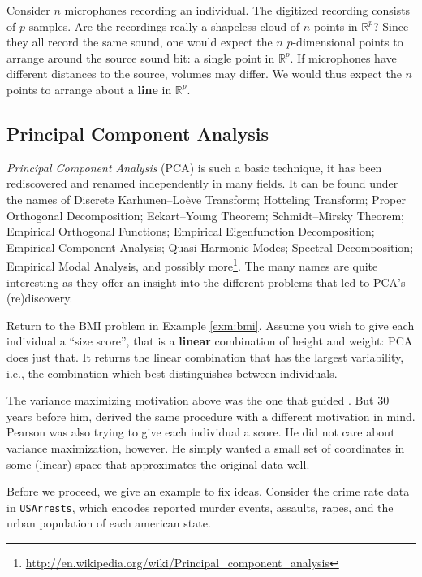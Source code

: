 \documentclass[]{book}
\theoremstyle{definition}
\theoremstyle{definition}
\theoremstyle{definition}
\theoremstyle{remark}
\let\BeginKnitrBlock\begin \let\EndKnitrBlock\end
\begin{document}
\BeginKnitrBlock{example}
\protect\hypertarget{exm:blind-signal}{}{\label{exm:blind-signal} }Consider
\(n\) microphones recording an individual. The digitized recording
consists of \(p\) samples. Are the recordings really a shapeless cloud
of \(n\) points in \(\mathbb{R}^p\)? Since they all record the same
sound, one would expect the \(n\) \(p\)-dimensional points to arrange
around the source sound bit: a single point in \(\mathbb{R}^p\). If
microphones have different distances to the source, volumes may differ.
We would thus expect the \(n\) points to arrange about a \textbf{line}
in \(\mathbb{R}^p\).
\EndKnitrBlock{example}

\subsection{Principal Component Analysis}\label{pca}

\emph{Principal Component Analysis} (PCA) is such a basic technique, it
has been rediscovered and renamed independently in many fields. It can
be found under the names of Discrete Karhunen--Loève Transform;
Hotteling Transform; Proper Orthogonal Decomposition; Eckart--Young
Theorem; Schmidt--Mirsky Theorem; Empirical Orthogonal Functions;
Empirical Eigenfunction Decomposition; Empirical Component Analysis;
Quasi-Harmonic Modes; Spectral Decomposition; Empirical Modal Analysis,
and possibly more\footnote{\url{http://en.wikipedia.org/wiki/Principal_component_analysis}}.
The many names are quite interesting as they offer an insight into the
different problems that led to PCA's (re)discovery.

Return to the BMI problem in Example \ref{exm:bmi}. Assume you wish to
give each individual a ``size score'', that is a \textbf{linear}
combination of height and weight: PCA does just that. It returns the
linear combination that has the largest variability, i.e., the
combination which best distinguishes between individuals.

The variance maximizing motivation above was the one that guided
\citet{hotelling1933analysis}. But \(30\) years before him,
\citet{pearson1901liii} derived the same procedure with a different
motivation in mind. Pearson was also trying to give each individual a
score. He did not care about variance maximization, however. He simply
wanted a small set of coordinates in some (linear) space that
approximates the original data well.

Before we proceed, we give an example to fix ideas. Consider the crime
rate data in \texttt{USArrests}, which encodes reported murder events,
assaults, rapes, and the urban population of each american state.
\end{document}
